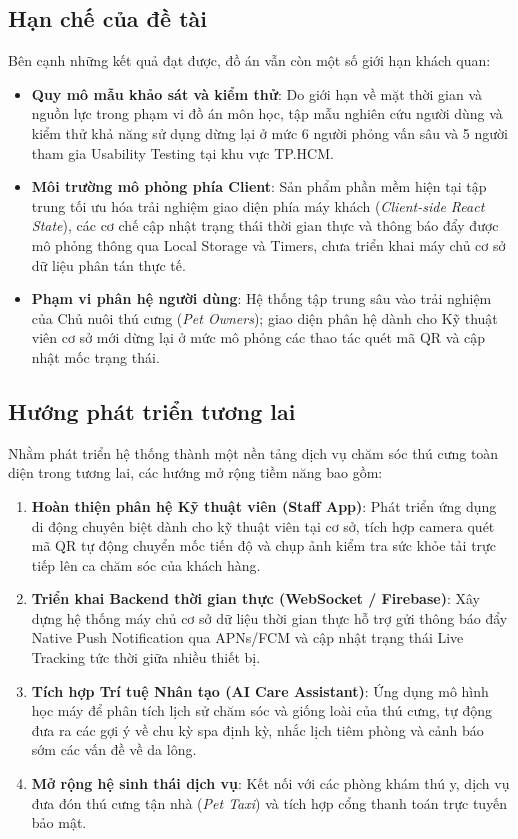 \subsection{Hạn chế của đề tài}
Bên cạnh những kết quả đạt được, đồ án vẫn còn một số giới hạn khách quan:
\begin{itemize}
    \item \textbf{Quy mô mẫu khảo sát và kiểm thử}: Do giới hạn về mặt thời gian và nguồn lực trong phạm vi đồ án môn học, tập mẫu nghiên cứu người dùng và kiểm thử khả năng sử dụng dừng lại ở mức 6 người phỏng vấn sâu và 5 người tham gia Usability Testing tại khu vực TP.HCM.
    \item \textbf{Môi trường mô phỏng phía Client}: Sản phẩm phần mềm hiện tại tập trung tối ưu hóa trải nghiệm giao diện phía máy khách (\textit{Client-side React State}), các cơ chế cập nhật trạng thái thời gian thực và thông báo đẩy được mô phỏng thông qua Local Storage và Timers, chưa triển khai máy chủ cơ sở dữ liệu phân tán thực tế.
    \item \textbf{Phạm vi phân hệ người dùng}: Hệ thống tập trung sâu vào trải nghiệm của Chủ nuôi thú cưng (\textit{Pet Owners}); giao diện phân hệ dành cho Kỹ thuật viên cơ sở mới dừng lại ở mức mô phỏng các thao tác quét mã QR và cập nhật mốc trạng thái.
\end{itemize}

\subsection{Hướng phát triển tương lai}
Nhằm phát triển hệ thống thành một nền tảng dịch vụ chăm sóc thú cưng toàn diện trong tương lai, các hướng mở rộng tiềm năng bao gồm:
\begin{enumerate}
    \item \textbf{Hoàn thiện phân hệ Kỹ thuật viên (Staff App)}: Phát triển ứng dụng di động chuyên biệt dành cho kỹ thuật viên tại cơ sở, tích hợp camera quét mã QR tự động chuyển mốc tiến độ và chụp ảnh kiểm tra sức khỏe tải trực tiếp lên ca chăm sóc của khách hàng.
    \item \textbf{Triển khai Backend thời gian thực (WebSocket / Firebase)}: Xây dựng hệ thống máy chủ cơ sở dữ liệu thời gian thực hỗ trợ gửi thông báo đẩy Native Push Notification qua APNs/FCM và cập nhật trạng thái Live Tracking tức thời giữa nhiều thiết bị.
    \item \textbf{Tích hợp Trí tuệ Nhân tạo (AI Care Assistant)}: Ứng dụng mô hình học máy để phân tích lịch sử chăm sóc và giống loài của thú cưng, tự động đưa ra các gợi ý về chu kỳ spa định kỳ, nhắc lịch tiêm phòng và cảnh báo sớm các vấn đề về da lông.
    \item \textbf{Mở rộng hệ sinh thái dịch vụ}: Kết nối với các phòng khám thú y, dịch vụ đưa đón thú cưng tận nhà (\textit{Pet Taxi}) và tích hợp cổng thanh toán trực tuyến bảo mật.
\end{enumerate}
